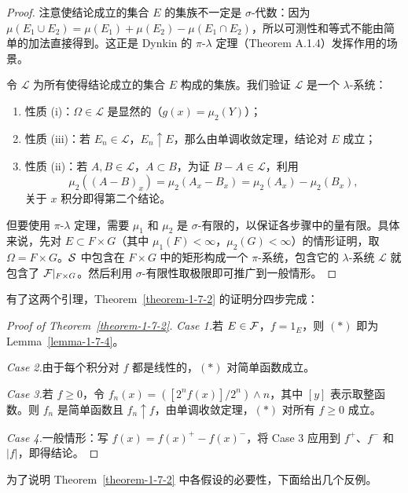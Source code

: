 \begin{proof}
    注意使结论成立的集合 $E$ 的集族不一定是 $\sigma$-代数：因为 $\mu(E_1 \cup E_2) = \mu(E_1) + \mu(E_2) - \mu(E_1 \cap E_2)$，所以可测性和等式不能由简单的加法直接得到。这正是 Dynkin 的 $\pi$-$\lambda$ 定理（Theorem A.1.4）发挥作用的场景。

    令 $\mathcal{L}$ 为所有使得结论成立的集合 $E$ 构成的集族。我们验证 $\mathcal{L}$ 是一个 $\lambda$-系统：
    \begin{enumerate}
        \item 性质 (i)：$\Omega \in \mathcal{L}$ 是显然的（$g(x) = \mu_2(Y)$）；
        \item 性质 (iii)：若 $E_n \in \mathcal{L}$，$E_n \uparrow E$，那么由单调收敛定理，结论对 $E$ 成立；
        \item 性质 (ii)：若 $A, B \in \mathcal{L}$，$A \subset B$，为证 $B - A \in \mathcal{L}$，利用
              \[
                  \mu_2((A - B)_x) = \mu_2(A_x - B_x) = \mu_2(A_x) - \mu_2(B_x),
              \]
              关于 $x$ 积分即得第二个结论。
    \end{enumerate}
    但要使用 $\pi$-$\lambda$ 定理，需要 $\mu_1$ 和 $\mu_2$ 是 $\sigma$-有限的，以保证各步骤中的量有限。具体来说，先对 $E \subset F \times G$（其中 $\mu_1(F) < \infty$，$\mu_2(G) < \infty$）的情形证明，取 $\Omega = F \times G$。$\mathcal{S}$ 中包含在 $F \times G$ 中的矩形构成一个 $\pi$-系统，包含它的 $\lambda$-系统 $\mathcal{L}$ 就包含了 $\mathcal{F}|_{F \times G}$。然后利用 $\sigma$-有限性取极限即可推广到一般情形。
\end{proof}

有了这两个引理，Theorem~\ref{theorem-1-7-2} 的证明分四步完成：

\begin{proof}[Proof of Theorem~\ref{theorem-1-7-2}]
    \textit{Case 1.}\quad 若 $E \in \mathcal{F}$，$f = 1_E$，则 $(\ast)$ 即为 Lemma~\ref{lemma-1-7-4}。

    \textit{Case 2.}\quad 由于每个积分对 $f$ 都是线性的，$(\ast)$ 对简单函数成立。

    \textit{Case 3.}\quad 若 $f \ge 0$，令 $f_n(x) = ([2^n f(x)]/2^n) \wedge n$，其中 $[y]$ 表示取整函数。则 $f_n$ 是简单函数且 $f_n \uparrow f$，由单调收敛定理，$(\ast)$ 对所有 $f \ge 0$ 成立。

    \textit{Case 4.}\quad 一般情形：写 $f(x) = f(x)^+ - f(x)^-$，将 Case 3 应用到 $f^+$、$f^-$ 和 $|f|$，即得结论。\qedhere
\end{proof}

为了说明 Theorem~\ref{theorem-1-7-2} 中各假设的必要性，下面给出几个反例。

